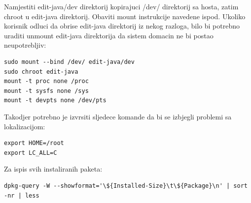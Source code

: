 \documentclass[12pt,vi]{mitthesis}
\begin{document}
\noindent
Namjestiti edit-java/dev direktorij kopirajuci /dev/ direktorij sa hosta, zatim chroot u edit-java direktorij.
Obaviti mount instrukcije navedene ispod. Ukoliko korisnik odluci da obrise edit-java direktorij iz nekog razloga,
bilo bi potrebno uraditi unmount edit-java direktorija da sistem domacin ne bi postao neupotrebljiv:
\begin{lstlisting}[style=BashInputStyle]
sudo mount --bind /dev/ edit-java/dev
sudo chroot edit-java
mount -t proc none /proc
mount -t sysfs none /sys
mount -t devpts none /dev/pts
\end{lstlisting}

\noindent
Takodjer potrebno je izvrsiti sljedece komande da bi se izbjegli problemi sa lokalizacijom:
\begin{lstlisting}[style=BashInputStyle]
export HOME=/root
export LC_ALL=C
\end{lstlisting}

\noindent
Za ispis svih instaliranih paketa:
\begin{lstlisting}[style=BashInputStyle]
dpkg-query -W --showformat='\${Installed-Size}\t\${Package}\n' | sort -nr | less
\end{lstlisting}
\end{document}
